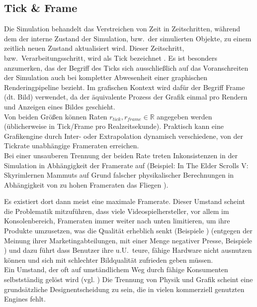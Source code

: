\subsection{Tick \& Frame}
\label{sec:tick}
Die Simulation behandelt das Verstreichen von Zeit in Zeitschritten, während dem der interne Zustand der Simulation, bzw.~der simulierten Objekte, zu einem zeitlich neuen Zustand aktualisiert wird.
Dieser Zeitschritt, bzw.~Verarbeitungsschritt, wird als Tick bezeichnet \cite{tick}.
Es ist besonders anzumerken, das der Begriff des Ticks sich ausschließlich auf das Voranschreiten der Simulation auch bei kompletter Abwesenheit einer graphischen Renderingpipeline bezieht. Im grafischen Kontext wird dafür der Begriff Frame (dt. Bild) verwendet, da der äquivalente Prozess der Grafik einmal pro Rendern und Anzeigen eines Bildes geschieht.\\

Von beiden Größen können Raten $r_{tick}, r_{frame} \in \mathbb{R}$ angegeben werden (üblicherweise in Tick/Frame pro Realzeitsekunde). Praktisch kann eine Grafikengine durch Inter- oder Extrapolation dynamisch verschiedene, von der Tickrate unabhängige Frameraten erreichen.\\

Bei einer unsauberen Trennung der beiden Rate treten Inkonsistenzen in der Simulation in Abhängigkeit der Framerate auf (Beispiel: In \glqq The Elder Scrolls V: Skyrim\grqq lernen Mammuts auf Grund falscher physikalischer Berechnungen in Abhängigkeit von zu hohen Frameraten das Fliegen \cite{flying-fucking-mammoths}).

Es existiert dort dann meist eine maximale Framerate.
Dieser Umstand scheint die Problematik mitzuführen, dass viele Videospielhersteller, vor allem im Konsolenbereich, Frameraten immer weiter nach unten limitieren, um ihre Produkte umzusetzen, was die Qualität erheblich senkt (Beispiele \cites{skyrim-physics-cap-and-fix, dark_souls-physics-cap-and-fix})
(entgegen der Meinung ihrer Marketingabteilungen, mit einer Menge negativer Presse, Beispiele \cites{morecinematic00, morecinematic01}
) und dazu führt dass Benutzer ihre u.U.~teure, fähige Hardware nicht ausnutzen können und sich mit schlechter Bildqualität zufrieden geben müssen.\\
Ein Umstand, der oft auf umständlichem Weg durch fähige Konsumenten selbstständig gelöst wird (vgl. \cites{skyrim-physics-cap-and-fix, dark_souls-physics-cap-and-fix})
Die Trennung von Physik und Grafik scheint eine grundsätzliche Designentscheidung zu sein, die in vielen kommerziell genutzten Engines fehlt.

